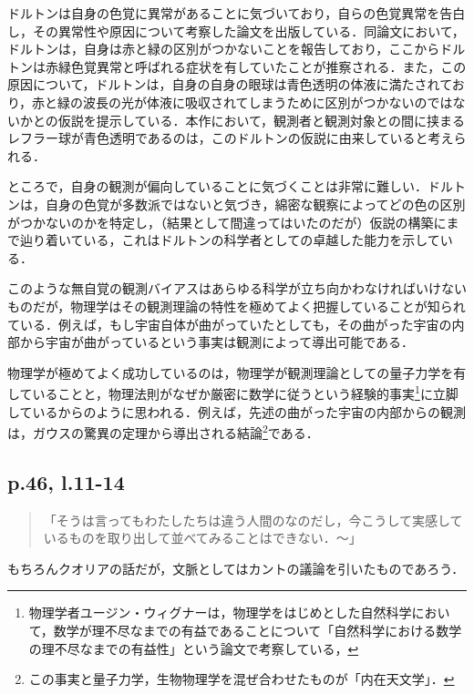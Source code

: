 \documentclass[10pt, a5paper, twoside]{jsarticle}
\theoremstyle{definition}
\begin{document}
                ドルトンは自身の色覚に異常があることに気づいており，自らの色覚異常を告白し，その異常性や原因について考察した論文\cite{dol}を出版している．同論文において，ドルトンは，自身は赤と緑の区別がつかないことを報告しており，ここからドルトンは赤緑色覚異常と呼ばれる症状を有していたことが推察される．また，この原因について，ドルトンは，自身の自身の眼球は青色透明の体液に満たされており，赤と緑の波長の光が体液に吸収されてしまうために区別がつかないのではないかとの仮説を提示している．本作において，観測者と観測対象との間に挟まるレフラー球が青色透明であるのは，このドルトンの仮説に由来していると考えられる．

                ところで，自身の観測が偏向していることに気づくことは非常に難しい．ドルトンは，自身の色覚が多数派ではないと気づき，綿密な観察によってどの色の区別がつかないのかを特定し，（結果として間違ってはいたのだが）仮説の構築にまで辿り着いている，これはドルトンの科学者としての卓越した能力を示している．

                このような無自覚の観測バイアスはあらゆる科学が立ち向かわなければいけないものだが，物理学はその観測理論の特性を極めてよく把握していることが知られている．例えば，もし宇宙自体が曲がっていたとしても，その曲がった宇宙の内部から宇宙が曲がっているという事実は観測によって導出可能である．

                物理学が極めてよく成功しているのは，物理学が観測理論としての量子力学を有していることと，物理法則がなぜか厳密に数学に従うという経験的事実\footnote{物理学者ユージン・ウィグナーは，物理学をはじめとした自然科学において，数学が理不尽なまでの有益であることについて「自然科学における数学の理不尽なまでの有益性」という論文\cite{wig}で考察している，}に立脚しているからのように思われる．例えば，先述の曲がった宇宙の内部からの観測は，ガウスの驚異の定理から導出される結論\footnote{この事実と量子力学，生物物理学を混ぜ合わせたものが「内在天文学」．}である．

            \subsection{p.46, l.11-14}

                \begin{quote}

                    「そうは言ってもわたしたちは違う人間のなのだし，今こうして実感しているものを取り出して並べてみることはできない．〜」

                \end{quote}

                もちろんクオリアの話だが，文脈としてはカントの議論を引いたものであろう．
\end{document}
